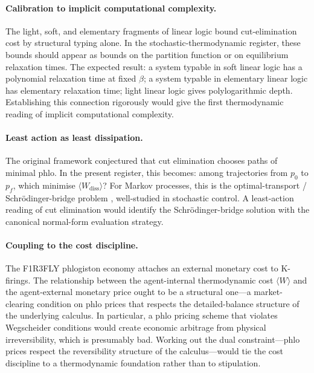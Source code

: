 \documentclass[11pt]{article}
\theoremstyle{plain}
\theoremstyle{definition}
\theoremstyle{remark}
\begin{document}
\paragraph{Calibration to implicit computational complexity.} The light, soft, and elementary fragments of linear logic \cite{Girard98LLL,Lafont04SLL,DanosJoinet03} bound cut-elimination cost by structural typing alone. In the stochastic-thermodynamic register, these bounds should appear as bounds on the partition function or on equilibrium relaxation times. The expected result: a system typable in soft linear logic has a polynomial relaxation time at fixed $\beta$; a system typable in elementary linear logic has elementary relaxation time; light linear logic gives polylogarithmic depth. Establishing this connection rigorously would give the first thermodynamic reading of implicit computational complexity.

\paragraph{Least action as least dissipation.} The original framework conjectured that cut elimination chooses paths of minimal phlo. In the present register, this becomes: among trajectories from $p_0$ to $p_f$, which minimise $\langle W_{\mathrm{diss}}\rangle$? For Markov processes, this is the optimal-transport / Schrödinger-bridge problem \cite{ChenGeorgiouPavon16}, well-studied in stochastic control. A least-action reading of cut elimination would identify the Schrödinger-bridge solution with the canonical normal-form evaluation strategy.

\paragraph{Coupling to the cost discipline.} The F1R3FLY phlogiston economy attaches an external monetary cost to K-firings. The relationship between the agent-internal thermodynamic cost $\langle W \rangle$ and the agent-external monetary price ought to be a structural one---a market-clearing condition on phlo prices that respects the detailed-balance structure of the underlying calculus. In particular, a phlo pricing scheme that violates Wegscheider conditions would create economic arbitrage from physical irreversibility, which is presumably bad. Working out the dual constraint---phlo prices respect the reversibility structure of the calculus---would tie the cost discipline to a thermodynamic foundation rather than to stipulation.
\end{document}
